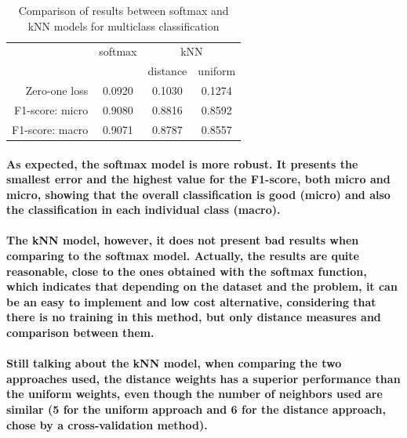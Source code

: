 \documentclass[a4paper]{article}    %
\begin{document}
\begin{table}[H]
    \begin{center}
        \begin{tabular}{ r|c|c|c|} 
            \cline{2-4}
            \multicolumn{1}{r}{}
             & \multicolumn{1}{|c|}{softmax}
             & \multicolumn{2}{|c|}{kNN} \\
            \cline{3-4}
            & & distance & uniform \\
            \cline{2-4}
            Zero-one loss   & 0.0920 & 0.1030 & 0.1274 \\
            F1-score: micro & 0.9080 & 0.8816 & 0.8592 \\
            F1-score: macro & 0.9071 & 0.8787 & 0.8557 \\
            \cline{2-4}
        \end{tabular}
    \end{center}
    \caption{Comparison of results between softmax and kNN models for multiclass classification}
    \label{tab:results}
\end{table}

\paragraph{As expected, the softmax model is more robust. It presents the smallest error and the highest value for the F1-score, both micro and micro, showing that the overall classification is good (micro) and also the classification in each individual class (macro).}

\paragraph{The kNN model, however, it does not present bad results when comparing to the softmax model. Actually, the results are quite reasonable, close to the ones obtained with the softmax function, which indicates that depending on the dataset and the problem, it can be an easy to implement and low cost alternative, considering that there is no training in this method, but only distance measures and comparison between them.}

\paragraph{Still talking about the kNN model, when comparing the two approaches used, the distance weights has a superior performance than the uniform weights, even though the number of neighbors used are similar (5 for the uniform approach and 6 for the distance approach, chose by a cross-validation method).}

\end{document}

